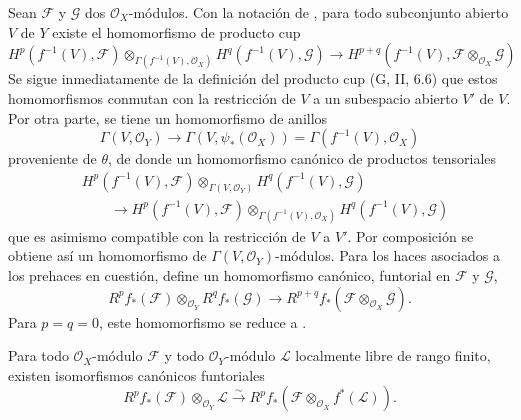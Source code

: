 \begin{env}[12.2.2]
\label{0.12.2.2}
\label{0.12.2.2-fr}
Sean $\mathcal F$ y $\mathcal G$ dos $\mathcal O_X$-módulos.
Con la notación de , para todo subconjunto abierto $V$ de
$Y$ existe el homomorfismo de producto cup 
\[
H^p(f^{-1}(V),\mathcal F)
\otimes_{\Gamma(f^{-1}(V),\mathcal O_X)}
H^q(f^{-1}(V),\mathcal G)
\longrightarrow
H^{p+q}(f^{-1}(V),\mathcal F\otimes_{\mathcal O_X}\mathcal G)
\]
Se sigue inmediatamente de la definición del producto cup
(G, II, 6.6) que estos homomorfismos conmutan con la restricción de
$V$ a un subespacio abierto $V'$ de $V$. Por otra parte, se tiene un homomorfismo de anillos
\[
\Gamma(V,\mathcal O_Y)\longrightarrow\Gamma(V,\psi_*(\mathcal O_X))
=\Gamma(f^{-1}(V),\mathcal O_X)
\]
proveniente de $\theta$, de donde un homomorfismo canónico de productos tensoriales
\[
\begin{aligned}
&H^p(f^{-1}(V),\mathcal F)\otimes_{\Gamma(V,\mathcal O_Y)}
H^q(f^{-1}(V),\mathcal G)\\
&\qquad\longrightarrow
H^p(f^{-1}(V),\mathcal F)
\otimes_{\Gamma(f^{-1}(V),\mathcal O_X)}
H^q(f^{-1}(V),\mathcal G)
\end{aligned}
\]
que es asimismo compatible con la restricción de $V$ a $V'$.
Por composición se obtiene así un homomorfismo de
$\Gamma(V,\mathcal O_Y)$-módulos.  Para los haces asociados a los
prehaces en cuestión, define un homomorfismo canónico,
funtorial en $\mathcal F$ y $\mathcal G$,
\[
\label{0.12.2.2.1-fr}
\tag{12.2.2.1}
R^p f_*(\mathcal F)\otimes_{\mathcal O_Y}R^q f_*(\mathcal G)
\longrightarrow
R^{p+q}f_*(\mathcal F\otimes_{\mathcal O_X}\mathcal G).
\]
Para $p=q=0$, este homomorfismo se reduce a
.
\end{env}

\begin{proposition}[12.2.3]
\label{0.12.2.3}
\label{0.12.2.3-fr}
Para todo $\mathcal O_X$-módulo $\mathcal F$ y todo $\mathcal O_Y$-módulo
$\mathcal L$ localmente libre de rango finito, existen isomorfismos canónicos
funtoriales
\[
\label{0.12.2.3.1-fr}
\tag{12.2.3.1}
R^p f_*(\mathcal F)\otimes_{\mathcal O_Y}\mathcal L
\xrightarrow{\sim}
R^p f_*(\mathcal F\otimes_{\mathcal O_X}f^*(\mathcal L)).
\]
\end{proposition}

